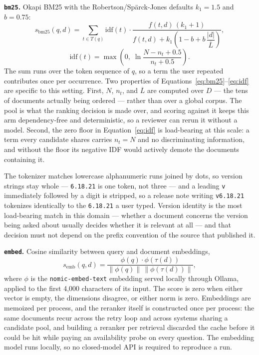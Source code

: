 \documentclass[acmsmall,review,anonymous,screen]{acmart}
\begin{document}
\textbf{\texttt{bm25}.} Okapi BM25 with the Robertson/Sp\"arck-Jones
defaults $k_1 = 1.5$ and $b = 0.75$:
\begin{equation}
s_{\mathrm{bm25}}(q, d) = \sum_{t \in T(q)} \mathrm{idf}(t) \cdot
\frac{f(t,d)\,(k_1 + 1)}{f(t,d) + k_1\left(1 - b + b\,\dfrac{|d|}{\overline{L}}\right)},
\label{eq:bm25}
\end{equation}
\begin{equation}
\mathrm{idf}(t) = \max\!\left(0,\; \ln \frac{N - n_t + 0.5}{n_t + 0.5}\right).
\label{eq:idf}
\end{equation}
The sum runs over the token sequence of $q$, so a term the user
repeated contributes once per occurrence. Two properties of
Equations~\eqref{eq:bm25}--\eqref{eq:idf} are specific to this setting.
First, $N$, $n_t$, and $\overline{L}$ are computed over $D$ --- the
tens of documents actually being ordered --- rather than over a global
corpus. The pool is what the ranking decision is made over, and scoring
against it keeps this arm dependency-free and deterministic, so a
reviewer can rerun it without a model. Second, the zero floor in
Equation~\eqref{eq:idf} is load-bearing at this scale: a term every
candidate shares carries $n_t = N$ and no discriminating information,
and without the floor its negative IDF would actively demote the
documents containing it.

The tokenizer matches lowercase alphanumeric runs joined by dots, so
version strings stay whole --- \texttt{6.18.21} is one token, not three
--- and a leading \texttt{v} immediately followed by a digit is
stripped, so a release note writing \texttt{v6.18.21} tokenizes
identically to the \texttt{6.18.21} a user typed. Version identity is
the most load-bearing match in this domain --- whether a document
concerns the version being asked about usually decides whether it is
relevant at all --- and that decision must not depend on the prefix
convention of the source that published it.

\textbf{\texttt{embed}.} Cosine similarity between query and document
embeddings,
\begin{equation}
s_{\mathrm{emb}}(q, d) = \frac{\phi(q) \cdot \phi(\tau(d))}{\lVert \phi(q) \rVert \, \lVert \phi(\tau(d)) \rVert},
\label{eq:embed}
\end{equation}
where $\phi$ is the \texttt{nomic-embed-text} embedding served locally
through Ollama, applied to the first 4{,}000 characters of its
input. The score is zero when either vector is empty, the dimensions
disagree, or either norm is zero. Embeddings are memoized per process,
and the reranker itself is constructed once per process: the same
documents recur across the retry loop and across systems sharing a
candidate pool, and building a reranker per retrieval discarded the
cache before it could be hit while paying an availability probe on
every question. The embedding model runs locally, so no closed-model
API is required to reproduce a run.
\end{document}
